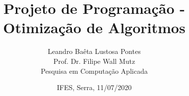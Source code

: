 \documentclass[12pt]{article}
\begin{document}
 
 
\title{Projeto de Programação - Otimização de Algoritmos}
\author{Leandro Baêta Lustosa Pontes \\ Prof. Dr. Filipe Wall Mutz \\ Pesquisa em Computação Aplicada}
\date{IFES, Serra, 11/07/2020}

\maketitle








 
\end{document}

